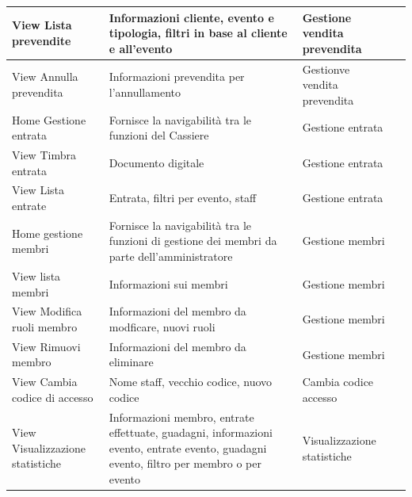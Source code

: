 \documentclass[a4paper]{article}
\begin{document}
\begin{center}
\begin{tabularx}{1\textwidth}{|X|X|X|X|}
    View Lista prevendite & Informazioni cliente, evento e tipologia, filtri in base al cliente e all'evento & Gestione vendita prevendita\\
    \hline
    View Annulla prevendita & Informazioni prevendita per l'annullamento & Gestionve vendita prevendita\\
    \hline
    Home Gestione entrata & Fornisce la navigabilità tra le funzioni del Cassiere & Gestione entrata\\
    \hline
    View Timbra entrata & Documento digitale & Gestione entrata\\
    \hline
    View Lista entrate & Entrata, filtri per evento, staff & Gestione entrata\\
    \hline
    Home gestione membri & Fornisce la navigabilità tra le funzioni di gestione dei membri da parte dell'amministratore & Gestione membri\\
    \hline
    View lista membri & Informazioni sui membri & Gestione membri\\
    \hline
    View Modifica ruoli membro & Informazioni del membro da modficare, nuovi ruoli & Gestione membri\\
    \hline
    View Rimuovi membro & Informazioni del membro da eliminare & Gestione membri\\
    \hline
    View Cambia codice di accesso & Nome staff, vecchio codice, nuovo codice & Cambia codice accesso\\
    \hline
    View Visualizzazione statistiche & Informazioni membro, entrate effettuate, guadagni, informazioni evento, entrate evento, guadagni evento, filtro per membro o per evento & Visualizzazione statistiche\\
    \hline
    \end{tabularx}
\end{center}
\end{document}
